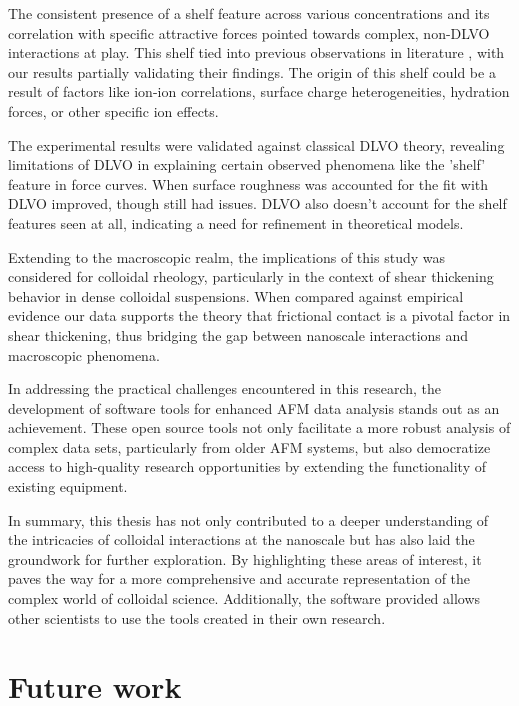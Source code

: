 The consistent presence of a shelf feature across various concentrations and its correlation with specific attractive forces pointed towards complex, non-DLVO interactions at play. This shelf tied into previous observations in literature \cite{Kilpatrick2013DirectlyProbing}, with our results partially validating their findings. The origin of this shelf could be a result of factors like ion-ion correlations, surface charge heterogeneities, hydration forces, or other specific ion effects.

The experimental results were validated against classical DLVO theory, revealing limitations of DLVO in explaining certain observed phenomena like the 'shelf' feature in force curves. When surface roughness was accounted for the fit with DLVO improved, though still had issues. DLVO also doesn't account for the shelf features seen at all, indicating a need for refinement in theoretical models. 

Extending to the macroscopic realm, the implications of this study was considered for colloidal rheology, particularly in the context of shear thickening behavior in dense colloidal suspensions. When compared against empirical evidence \cite{reference4} our data supports the theory that frictional contact is a pivotal factor in shear thickening, thus bridging the gap between nanoscale interactions and macroscopic phenomena.

In addressing the practical challenges encountered in this research, the development of software tools for enhanced AFM data analysis stands out as an achievement. These open source tools not only facilitate a more robust analysis of complex data sets, particularly from older AFM systems, but also democratize access to high-quality research opportunities by extending the functionality of existing equipment.

In summary, this thesis has not only contributed to a deeper understanding of the intricacies of colloidal interactions at the nanoscale but has also laid the groundwork for further exploration. By highlighting these areas of interest, it paves the way for a more comprehensive and accurate representation of the complex world of colloidal science. Additionally, the software provided allows other scientists to use the tools created in their own research.

\section{Future work}

